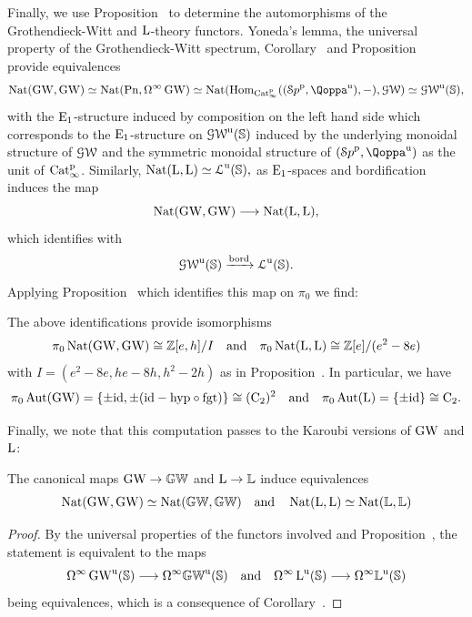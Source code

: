 Finally, we use Proposition~ to determine the automorphisms of the Grothendieck-Witt and $\operatorname L$-theory functors. Yoneda's lemma, the universal property of the Grothendieck-Witt spectrum, Corollary~ and Proposition~ provide equivalences
\[
\Nat(\GW,\GW) \simeq \Nat(\Poinc,\Omega^\infty\GW) \simeq \Nat(\Hom_{\Catp}((\Spa^\perf,\QF^\uni), -), \GWspace) \simeq \GWspace^\uni(\SS),
\]
with the ${\mathrm{E}_{1}}$-structure induced by composition on the left hand side which corresponds to the ${\mathrm{E}_{1}}$-structure on $\operatorname{\mathcal{GW}}^{\mathrm{u}}(\mathbb{S})$ induced by the underlying monoidal structure of $\operatorname{\mathcal{GW}}$ and the symmetric monoidal structure of $(\Spa^\perf,\QF^\uni)$ as the unit of $\mathrm{Cat}^{\mathrm p}_\infty$. Similarly,
$
\operatorname{Nat}(\operatorname L,\operatorname L) \simeq \operatorname{\mathcal{L}}^{\mathrm{u}}(\mathbb{S}),
$
as ${\mathrm{E}_{1}}$-spaces and bordification induces the map
\[
\operatorname{Nat}(\operatorname{GW},\operatorname{GW}) \longrightarrow \operatorname{Nat}(\operatorname L,\operatorname L),
\]
which identifies with
\[
\operatorname{\mathcal{GW}}^{\mathrm{u}}(\mathbb{S}) \xrightarrow{\mathrm{bord}} \operatorname{\mathcal{L}}^{\mathrm{u}}(\mathbb{S}).
\]
Applying Proposition~ which identifies this map on $\pi_0$ we find:
\begin{corollary}
\label{corollary:automorphisms-GW-L}%
The above identifications provide isomorphisms
\[
\pi_0\operatorname{Nat}(\operatorname{GW},\operatorname{GW}) \cong \mathbb{Z}[e,h]/I \quad \text{and} \quad \pi_0\operatorname{Nat}(\operatorname L,\operatorname L) \cong \mathbb{Z}[e]/(e^2-8e)
\]
with $I = (e^2-8e,he-8h,h^2-2h)$ as in Proposition~. In particular, we have 
\[
\pi_0\operatorname{Aut}(\operatorname{GW}) = \{\pm \mathrm{id}, \pm (\mathrm{id}-\mathrm{hyp} \circ \mathrm{fgt})\} \cong (\mathrm{C_2})^2 \quad \text{and} \quad \pi_0\operatorname{Aut}(\operatorname L) = \{\pm \mathrm{id}\} \cong \mathrm{C_2}.
\]
\end{corollary}


Finally, we note that this computation passes to the Karoubi versions of $\operatorname{GW}$ and $\operatorname L$:
\begin{corollary}
The canonical maps $\operatorname{GW} \to \mathbb{GW}$ and $\operatorname L \rightarrow \mathbb{L}$ induce equivalences
\[
\operatorname{Nat}(\operatorname{GW},\operatorname{GW}) \simeq \operatorname{Nat}(\mathbb{GW},\mathbb{GW}) \quad \text{and} \quad \operatorname{Nat}(\operatorname L,\operatorname L) \simeq \operatorname{Nat}(\mathbb{L},\mathbb{L})
\]
\end{corollary}
\begin{proof}
By the universal properties of the functors involved and Proposition~, the statement is equivalent to the maps 
\[
\Omega^\infty\operatorname{GW}^{\mathrm{u}}(\mathbb{S}) \longrightarrow \Omega^\infty\mathbb{GW}^{\mathrm{u}}(\mathbb{S}) \quad \text{and} \quad \Omega^\infty\operatorname L^{\mathrm{u}}(\mathbb{S}) \longrightarrow \Omega^\infty \mathbb{L}^{\mathrm{u}}(\mathbb{S})
\]
being equivalences, which is a consequence of Corollary~.
\end{proof}
